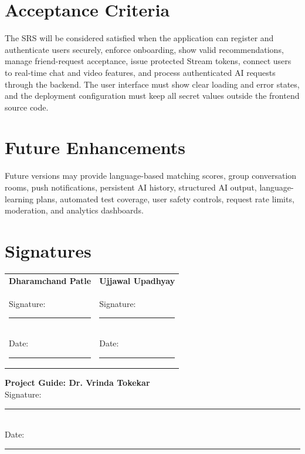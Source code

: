 \documentclass[12pt,a4paper]{report}
\begin{document}
\chapter{Acceptance Criteria}
The SRS will be considered satisfied when the application can register and authenticate users securely, enforce onboarding, show valid recommendations, manage friend-request acceptance, issue protected Stream tokens, connect users to real-time chat and video features, and process authenticated AI requests through the backend. The user interface must show clear loading and error states, and the deployment configuration must keep all secret values outside the frontend source code.

\chapter{Future Enhancements}
Future versions may provide language-based matching scores, group conversation rooms, push notifications, persistent AI history, structured AI output, language-learning plans, automated test coverage, user safety controls, request rate limits, moderation, and analytics dashboards.

\chapter*{Signatures}
\vspace{0.25in}
\begin{tabular}{p{3.1in}p{3.1in}}
\textbf{Dharamchand Patle} & \textbf{Ujjawal Upadhyay} \\
Signature: \rule{2.1in}{0.4pt} & Signature: \rule{2.1in}{0.4pt} \\
Date: \rule{2.45in}{0.4pt} & Date: \rule{2.45in}{0.4pt} \\
\end{tabular}

\vspace{0.65in}
\textbf{Project Guide: Dr. Vrinda Tokekar}\\[0.2in]
Signature: \rule{2.5in}{0.4pt}\\[0.15in]
Date: \rule{3in}{0.4pt}
\end{document}
